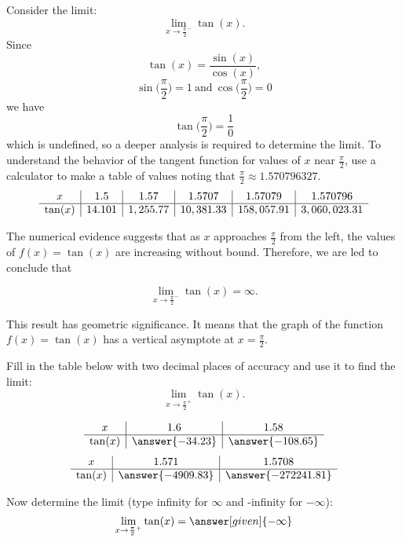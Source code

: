 \documentclass{ximera}
\begin{document}
\begin{example}[example 7]
Consider the limit:
\[\lim_{x \to \frac{\pi}{2}^-} \tan(x). \]
Since
\[\tan(x) = \frac{\sin(x)}{\cos(x)},\]
\[\sin\big(\frac{\pi}{2}\big) = 1 \ \text{and} \ \cos\big(\frac{\pi}{2}\big) = 0\]
we have
 \[\tan\big(\frac{\pi}{2}\big) = \frac{1}{0}\]
which is undefined, so a deeper analysis is required to determine the limit.
To understand the behavior of the tangent function for values of $x$ near $\frac{\pi}{2}$, 
use a calculator to make a table of values noting that $\frac{\pi}{2} \approx 1.570796327$.\\

\[
\begin{array}{ c | c | c | c | c | c}
  x & 1.5 & 1.57 & 1.5707  & 1.57079 & 1.570796 \\ 
	\hline
  \tan(x) & 14.101 & 1,255.77 & 10,381.33 & 158,057.91  & 3,060,023.31 
\end{array}
\] 

The numerical evidence suggests that as $x$ approaches $\frac{\pi}{2}$ from the left, 
the values of $f(x) = \tan(x)$ are 
increasing without bound.
Therefore, we are led to conclude that 

\[\lim_{x \to \frac{\pi}{2}^-} \tan(x) = \infty. \]

This result has geometric significance.  It means that the graph of the function $f(x) = \tan(x)$ has a 
vertical asymptote at $x=\frac{\pi}{2}.$
\end{example}



\begin{problem}[problem 9]
Fill in the table below with two decimal places of accuracy and use it to find the limit:
\[\lim_{x \to \frac{\pi}{2}^+} \tan(x).\]

\begin{prompt}
\begin{center}
\[
\begin{array}{ c | c | c }
  x & 1.6 & 1.58   \\ 
	\hline 
	 \tan(x) & \answer{-34.23} & \answer{-108.65} 
\end{array}
\]
\[
\begin{array}{ c | c | c  }
  x  & 1.571 & 1.5708 \\ 
	\hline 
	 \tan(x)  & \answer{-4909.83} & \answer{-272241.81}
\end{array}
\]
\end{center}
Now determine the limit (type infinity for $\infty$ and -infinity for $-\infty$):
\[
\lim_{x \to \frac{\pi}{2}^+} \tan(x) = \answer[given]{-\infty}
\]
\end{prompt}
\end{problem}
\end{document}

